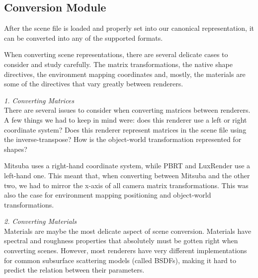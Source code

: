 \subsection{Conversion Module}
After the scene file is loaded and properly set into our canonical
representation, it can be converted into any of the supported formats.

When converting scene representations, there are several delicate cases to
consider and study carefully. The matrix transformations, the native shape
directives, the environment mapping coordinates and, mostly, the materials are
some of the directives that vary greatly between renderers. 

\textit{1. Converting Matrices} \\
There are several issues to consider when converting matrices between renderers.
A few things we had to keep in mind were: does this renderer use a left or right
coordinate system? Does this renderer represent matrices in the scene file using
the inverse-transpose? How is the object-world transformation represented for
shapes?

Mitsuba uses a right-hand coordinate system, while PBRT and LuxRender use a
left-hand one. This meant that, when converting between Mitsuba and the other
two, we had to mirror the x-axis of all camera matrix transformations. This was
also the case for environment mapping positioning and object-world
transformations.



\textit{2. Converting Materials} \\
Materials are maybe the most delicate aspect of scene conversion. Materials have
spectral and roughness properties that absolutely must be gotten right when
converting scenes. However, most renderers have very different implementations
for common subsurface scattering models (called BSDFs), making it hard to
predict the relation between their parameters.

